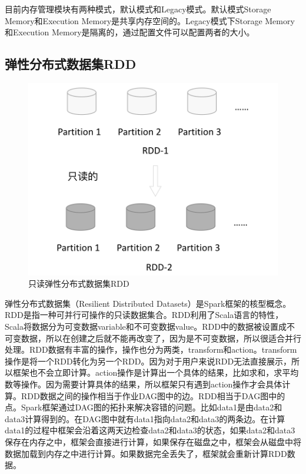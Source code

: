 目前内存管理模块有两种模式，默认模式和Legacy模式。默认模式Storage Memory和Execution Memory是共享内存空间的。Legacy模式下Storage Memory和Execution Memory是隔离的，通过配置文件可以配置两者的大小。

\subsection{弹性分布式数据集RDD}

\begin{figure}[htbp]
    \centering
    \includegraphics[width=1\textwidth]{Img/rdd-readonly.png}
    \caption{只读弹性分布式数据集RDD}
    \label{fig:rdd}
\end{figure}

弹性分布式数据集（Resilient Distributed Datasets）是Spark框架的核型概念。RDD是指一种可并行可操作的只读数据集合。RDD利用了Scala语言的特性，Scala将数据分为可变数据variable和不可变数据value。RDD中的数据被设置成不可变数据，所以在创建之后就不能再改变了，因为是不可变数据，所以很适合并行处理。RDD数据有丰富的操作，操作也分为两类，transform和action。transform操作是将一个RDD转化为另一个RDD。因为对于用户来说RDD无法直接展示，所以框架也不会立即计算。action操作是计算出一个具体的结果，比如求和，求平均数等操作。因为需要计算具体的结果，所以框架只有遇到action操作才会具体计算。RDD数据之间的操作相当于作业DAG图中的边。RDD相当于DAG图中的点。Spark框架通过DAG图的拓扑来解决容错的问题。比如data1是由data2和data3计算得到的。在DAG图中就有data1指向data2和data3的两条边。在计算data1的过程中框架会沿着这两天边检查data2和data3的状态，如果data2和data3保存在内存之中，框架会直接进行计算，如果保存在磁盘之中，框架会从磁盘中将数据加载到内存之中进行计算。如果数据完全丢失了，框架就会重新计算RDD数据。

